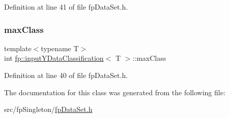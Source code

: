 Definition at line 41 of file fp\+Data\+Set.\+h.

\mbox{\label{classfp_1_1inputYDataClassification_a5edb210f521aebaaf8d73b5c9ef68cf1}} 
\subsubsection{\texorpdfstring{max\+Class}{maxClass}}
{\footnotesize\ttfamily template$<$typename T$>$ \\
int \hyperlink{classfp_1_1inputYDataClassification}{fp\+::input\+Y\+Data\+Classification}$<$ T $>$\+::max\+Class\hspace{0.3cm}{\ttfamily [private]}}



Definition at line 40 of file fp\+Data\+Set.\+h.



The documentation for this class was generated from the following file\+:\begin{DoxyCompactItemize}
\item 
src/fp\+Singleton/\hyperlink{fpDataSet_8h}{fp\+Data\+Set.\+h}\end{DoxyCompactItemize}
